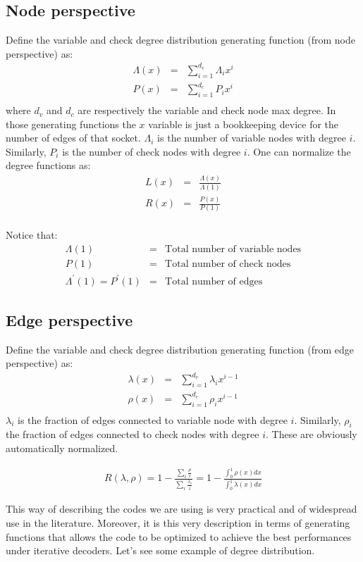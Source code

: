\subsection{Node perspective}
Define the variable and check degree distribution generating function (from node perspective) as:
\begin{eqnarray}
	\Lambda(x) &=& \sum_{i=1}^{d_v} \Lambda_i x^i \\
	P(x) &=& \sum_{i=1}^{d_c} P_i x^i \\
\end{eqnarray}
where $d_v$ and $d_c$ are respectively the variable and check node max degree. In those generating functions the $x$ variable is just a bookkeeping device for the number of edges of that socket.
$\Lambda_i$ is the number of variable nodes with degree $i$. Similarly, $P_i$ is the number of check nodes with degree $i$. One can normalize the degree functions as:
\begin{eqnarray}
L(x) &=& \frac{\Lambda(x)}{\Lambda(1)} \\
R(x) &=& \frac{P(x)}{P(1)} \\
\end{eqnarray}

Notice that:
\begin{eqnarray}
\Lambda(1) &=& \text{Total number of variable nodes} \\
P(1) &=& \text{Total number of check nodes} \\
\Lambda^\prime(1) = P^\prime(1) &=&  \text{Total number of edges}
\end{eqnarray}


\subsection{Edge perspective}
Define the variable and check degree distribution generating function (from edge perspective) as:
\begin{eqnarray}
\lambda(x) &=& \sum_{i=1}^{d_v} \lambda_i x^{i-1} \\
\rho(x) &=& \sum_{i=1}^{d_c} \rho_i x^{i-1} \\
\end{eqnarray}
$\lambda_i$ is the fraction of edges connected to variable node with degree $i$. Similarly, $\rho_i$ the fraction of edges connected to check nodes with degree $i$. These are obviously automatically normalized.
\begin{definition}
	\begin{eqnarray}
	R(\lambda, \rho) = 1 - \frac{\sum_i \frac{\rho}{i}}{\sum_i \frac{\lambda_i}{i}} = 1 - \frac{\int_0^1 \rho(x)dx}{\int_0^1 \lambda(x)dx}
	\end{eqnarray}
\end{definition}
This way of describing the codes we are using is very practical and of widespread use in the literature. Moreover, it is this very description in terms of generating functions that allows the code to be optimized to achieve the best performances under iterative decoders.
Let's see some example of degree distribution.

